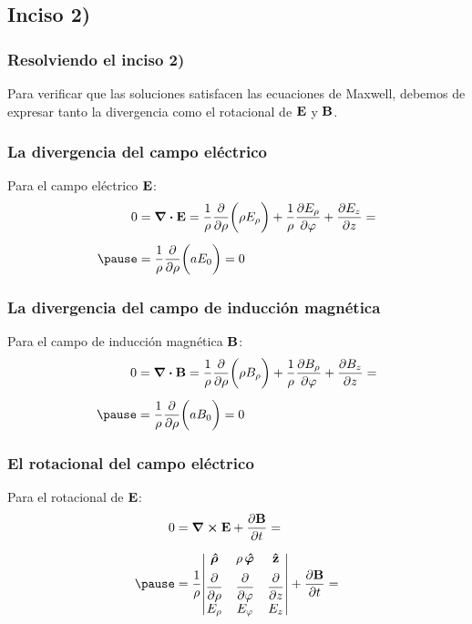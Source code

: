 \documentclass[12pt]{beamer}
\begin{document}
\subsection{Inciso 2)}
\begin{frame}
\frametitle{Resolviendo el inciso 2)}
Para verificar que las soluciones satisfacen las ecuaciones de Maxwell, debemos de expresar tanto la divergencia como el rotacional de $\vb{E}$ y $\vb{B}$.
\end{frame}
\begin{frame}
\frametitle{La divergencia del campo eléctrico}
Para el campo eléctrico $\vb{E}$:
\pause
\begin{eqnarray*}
\begin{aligned}
0 &= \div{\vb{E}} = \dfrac{1}{\rho} \pdv{\rho} \bigg( \rho E_{\rho} \bigg) + \dfrac{1}{\rho} \pdv{E_{\rho}}{\varphi} + \pdv{E_{z}}{z} = \\[0.5em] \pause
&= \dfrac{1}{\rho} \pdv{\rho} \bigg( a E_{0} \bigg) = 0
\end{aligned}
\end{eqnarray*}
\end{frame}
\begin{frame}
\frametitle{La divergencia del campo de inducción magnética}
Para el campo de inducción magnética $\vb{B}$:
\pause
\begin{eqnarray*}
\begin{aligned}
0 &= \div{\vb{B}} = \dfrac{1}{\rho} \pdv{\rho} \bigg( \rho B_{\rho} \bigg) + \dfrac{1}{\rho} \pdv{B_{\rho}}{\varphi} + \pdv{B_{z}}{z} = \\[0.5em] \pause
&= \dfrac{1}{\rho} \pdv{\rho} \bigg( a B_{0}\bigg) = 0
\end{aligned}
\end{eqnarray*}
\end{frame}
\begin{frame}
\frametitle{El rotacional del campo eléctrico}
Para el rotacional de $\vb{E}$:
\pause
\begin{eqnarray*}
\begin{aligned}
0 &= \curl{\vb{E}} + \pdv{\vb{B}}{t} = \\[0.5em] \pause
&= \dfrac{1}{\rho} \mqty|
\vu{\bm{\rho}} & \rho \, \vu{\bm{\varphi}} & \vu{z} \\[0.5em] 
\displaystyle \pdv{\rho} & \displaystyle  \pdv{\varphi} & \displaystyle \pdv{z} \\[0.5em] 
E_{\rho} & E_{\varphi} & E_{z} | + \pdv{\vb{B}}{t} =
\end{aligned}
\end{eqnarray*}
\end{frame}
\end{document}
